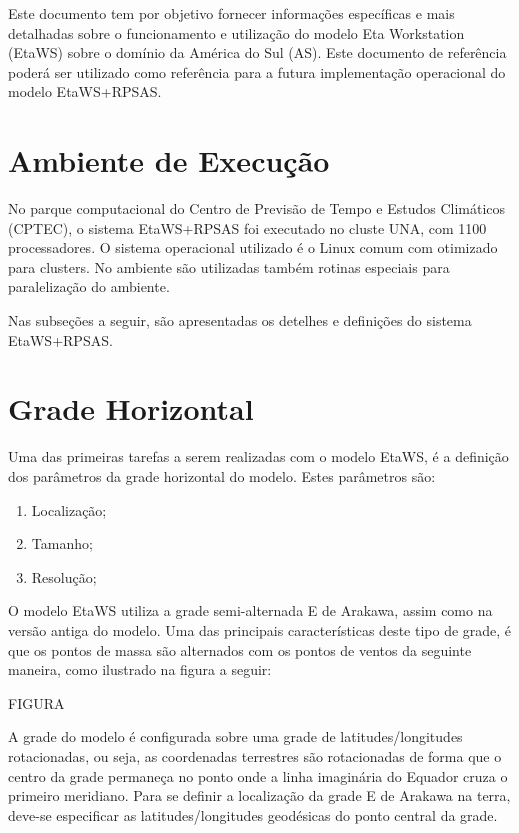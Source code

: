 Este documento tem por objetivo fornecer informações específicas e mais detalhadas sobre o funcionamento e utilização do modelo Eta Workstation (EtaWS) sobre o domínio da América do Sul (AS). Este documento de referência poderá ser utilizado como referência para a futura implementação operacional do modelo EtaWS+RPSAS.

\section{Ambiente de Execução}
\label{ss:ambexeceta}

No parque computacional do Centro de Previsão de Tempo e Estudos Climáticos (CPTEC), o sistema EtaWS+RPSAS foi executado no cluste UNA, com 1100 processadores. O sistema operacional utilizado é o Linux comum com otimizado para clusters. No ambiente são utilizadas também rotinas especiais para paralelização do ambiente.

Nas subseções a seguir, são apresentadas os detelhes e definições do sistema EtaWS+RPSAS.

\section{Grade Horizontal}
\label{ss:gradehorizontal}

Uma das primeiras tarefas a serem realizadas com o modelo EtaWS, é a definição dos parâmetros da grade horizontal do modelo. Estes parâmetros são:

\begin{enumerate}
\item Localização;
\item Tamanho;
\item Resolução;
\end{enumerate}

O modelo EtaWS utiliza a grade semi-alternada E de Arakawa, assim como na versão antiga do modelo. Uma das principais características deste tipo de grade, é que os pontos de massa são alternados com os pontos de ventos da seguinte maneira, como ilustrado na figura a seguir:

FIGURA

A grade do modelo é configurada sobre uma grade de latitudes/longitudes rotacionadas, ou seja, as coordenadas terrestres são rotacionadas de forma que o centro da grade permaneça no ponto onde a linha imaginária do Equador cruza o primeiro meridiano. Para se definir a localização da grade E de Arakawa na terra, deve-se especificar as latitudes/longitudes geodésicas do ponto central da grade.


